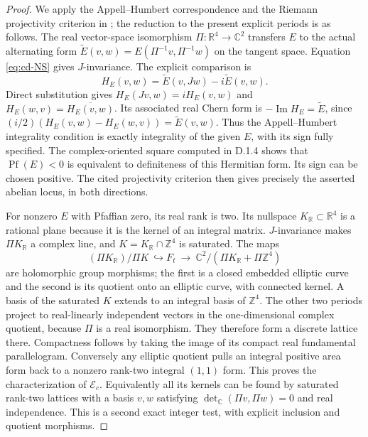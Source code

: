 \begin{proof}
We apply the Appell--Humbert correspondence and the Riemann projectivity
criterion in \cite[Theorems 4.1 and 4.4]{Schnell19}; the reduction to the
present explicit periods is as follows. The real vector-space isomorphism
$\Pi:\mathbb R^4\to\mathbb C^2$ transfers $E$ to the actual alternating
form $\widetilde E(v,w)=E(\Pi^{-1}v,\Pi^{-1}w)$ on the tangent space.
Equation \eqref{eq:cd-NS} gives $J$-invariance. The explicit comparison is
\[
 H_E(v,w)=\widetilde E(v,Jw)-i\widetilde E(v,w).
\]
Direct substitution gives $H_E(Jv,w)=iH_E(v,w)$ and
$H_E(w,v)=\overline{H_E(v,w)}$. Its associated real Chern form is
$-\operatorname{Im}H_E=\widetilde E$, since
$(i/2)(H_E(v,w)-H_E(w,v))=\widetilde E(v,w)$.
Thus the Appell--Humbert integrality condition is exactly integrality
of the given $E$, with its sign fully specified. The complex-oriented square computed in D.1.4 shows that
$\operatorname{Pf}(E)<0$ is equivalent to definiteness of this Hermitian
form. Its sign can be chosen positive. The cited projectivity criterion
then gives precisely the asserted abelian locus, in both directions.

For nonzero $E$ with Pfaffian zero, its real rank is two. Its nullspace
$K_{\mathbb R}\subset\mathbb R^4$ is a rational plane because it is the
kernel of an integral matrix. $J$-invariance makes $\Pi K_{\mathbb R}$ a
complex line, and $K=K_{\mathbb R}\cap\mathbb Z^4$ is saturated. The maps
\[
 (\Pi K_{\mathbb R})/\Pi K\ \hookrightarrow F_t
 \ \longrightarrow\
 \mathbb C^2/(\Pi K_{\mathbb R}+\Pi\mathbb Z^4)
\]
are holomorphic group morphisms; the first is a closed embedded elliptic
curve and the second is its quotient onto an elliptic curve, with
connected kernel. A basis of the saturated $K$ extends to an integral basis of $\mathbb Z^4$.
The other two periods project to real-linearly independent vectors in the
one-dimensional complex quotient, because $\Pi$ is a real isomorphism.
They therefore form a discrete lattice there. Compactness follows by
taking the image of its compact real fundamental parallelogram. Conversely any elliptic quotient
pulls an integral positive area form back to a nonzero rank-two integral
$(1,1)$ form. This proves the characterization of $\mathcal E_c$.
Equivalently all its kernels can be found by saturated rank-two lattices
with a basis $v,w$ satisfying
$\det_{\mathbb C}(\Pi v,\Pi w)=0$ and real independence. This is a second
exact integer test, with explicit inclusion and quotient morphisms.


\end{proof}
